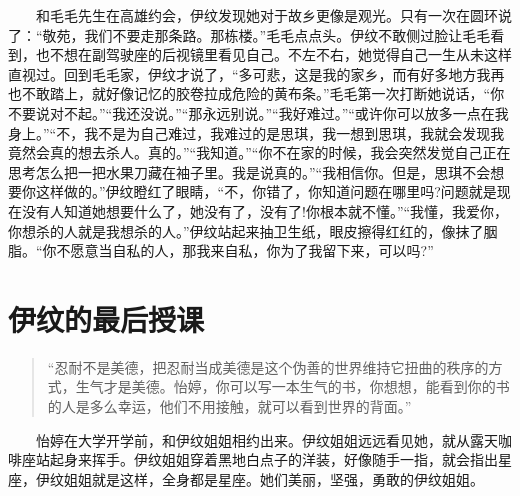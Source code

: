 \documentclass[12pt,UTF8]{ctexbook}
\begin{document}
　　和毛毛先生在高雄约会，伊纹发现她对于故乡更像是观光。只有一次在圆环说了：\enquote{敬苑，我们不要走那条路。那栋楼。}毛毛点点头。伊纹不敢侧过脸让毛毛看到，也不想在副驾驶座的后视镜里看见自己。不左不右，她觉得自己一生从未这样直视过。回到毛毛家，伊纹才说了，\enquote{多可悲，这是我的家乡，而有好多地方我再也不敢踏上，就好像记忆的胶卷拉成危险的黄布条。}毛毛第一次打断她说话，\enquote{你不要说对不起。}\enquote{我还没说。}\enquote{那永远别说。}\enquote{我好难过。}\enquote{或许你可以放多一点在我身上。}\enquote{不，我不是为自己难过，我难过的是思琪，我一想到思琪，我就会发现我竟然会真的想去杀人。真的。}\enquote{我知道。}\enquote{你不在家的时候，我会突然发觉自己正在思考怎么把一把水果刀藏在袖子里。我是说真的。}\enquote{我相信你。但是，思琪不会想要你这样做的。}伊纹瞪红了眼睛，\enquote{不，你错了，你知道问题在哪里吗?问题就是现在没有人知道她想要什么了，她没有了，没有了!你根本就不懂。}\enquote{我懂，我爱你，你想杀的人就是我想杀的人。}伊纹站起来抽卫生纸，眼皮擦得红红的，像抹了胭脂。\enquote{你不愿意当自私的人，那我来自私，你为了我留下来，可以吗?}

\hypertarget{ux4f0aux7eb9ux7684ux6700ux540eux6388ux8bfe}{%
\section*{伊纹的最后授课}\label{ux4f0aux7eb9ux7684ux6700ux540eux6388ux8bfe}}

\begin{quote}
\enquote{忍耐不是美德，把忍耐当成美德是这个伪善的世界维持它扭曲的秩序的方式，生气才是美德。怡婷，你可以写一本生气的书，你想想，能看到你的书的人是多么幸运，他们不用接触，就可以看到世界的背面。}
\end{quote}

　　怡婷在大学开学前，和伊纹姐姐相约出来。伊纹姐姐远远看见她，就从露天咖啡座站起身来挥手。伊纹姐姐穿着黑地白点子的洋装，好像随手一指，就会指出星座，伊纹姐姐就是这样，全身都是星座。她们美丽，坚强，勇敢的伊纹姐姐。
\end{document}
